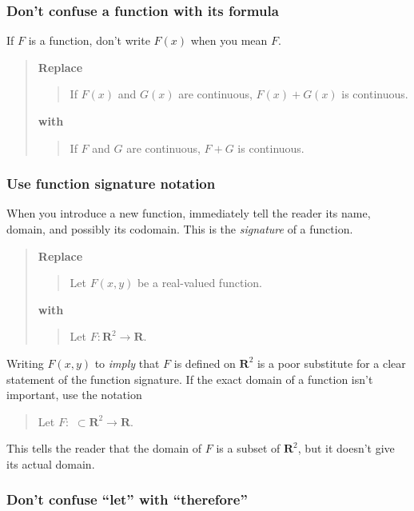 \documentclass[12pt,fleqn]{article}
\newcounter{ex}\setcounter{ex}{0}
\newcounter{se}\setcounter{se}{0}
\begin{document}
 \subsubsection{  Don't confuse a function with its formula}

If \(F\) is a function, don't write \(F(x)\) when you mean \(F\).

\begin{quote}
\textbf{\textbf{Replace}}
\begin{quote}
If \(F(x) \) and \(G(x)\) are continuous, \(F(x) + G(x)\) is 
continuous.
\end{quote}
\textbf{with}
\begin{quote}
If \(F\) and \(G\) are continuous, \(F + G\) is 
continuous.
\end{quote}
\end{quote}

 \subsubsection{  Use function signature notation}

When you introduce a new function, immediately tell the reader its 
name, domain, and possibly its codomain. This is the \emph{signature}
of a function.
\begin{quote}
\textbf{\textbf{Replace}}
\begin{quote}
Let \(F(x,y)\) be a real-valued function.
\end{quote}
\textbf{with}
\begin{quote}
Let \(F : \mathbf{R}^2 \to \mathbf{R}\).
\end{quote}
\end{quote}
Writing \(F(x,y)\) to \emph{imply} that \(F\) is defined
on \( \mathbf{R}^2\) is a poor substitute for a clear statement of 
the function signature. If the exact domain of a function isn't 
important, use the notation
\begin{quote}
Let \(F :\,\, \subset \mathbf{R}^2 \to \mathbf{R}\).
\end{quote}
This tells the reader that the domain of \(F\) is a subset
of \(\mathbf{R}^2\), but it doesn't give its actual domain.


 \subsubsection{ Don't confuse ``let'' with ``therefore''}
\end{document}
